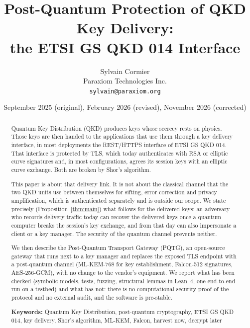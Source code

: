 \documentclass[11pt,letterpaper]{article}
\title{\textbf{Post-Quantum Protection of QKD Key Delivery:\\ the ETSI GS QKD 014 Interface}}
\author{
    Sylvain Cormier \\
    Paraxiom Technologies Inc. \\
    \texttt{sylvain@paraxiom.org}
}
\date{September 2025 (original), February 2026 (revised), November 2026 (corrected)}
\begin{document}
\maketitle

\begin{abstract}
Quantum Key Distribution (QKD) produces keys whose secrecy rests on physics. Those keys are then handed to the applications that use them through a key delivery interface, in most deployments the REST/HTTPS interface of ETSI GS QKD 014. That interface is protected by TLS, which today authenticates with RSA or elliptic curve signatures and, in most configurations, agrees its session keys with an elliptic curve exchange. Both are broken by Shor's algorithm.

This paper is about that delivery link. It is not about the classical channel that the two QKD units use between themselves for sifting, error correction and privacy amplification, which is authenticated separately and is outside our scope. We state precisely (Proposition~\ref{thm:main}) what follows for the delivered keys: an adversary who records delivery traffic today can recover the delivered keys once a quantum computer breaks the session's key exchange, and from that day can also impersonate a client or a key manager. The security of the quantum channel prevents neither.

We then describe the Post-Quantum Transport Gateway (PQTG), an open-source gateway that runs next to a key manager and replaces the exposed TLS endpoint with a post-quantum channel (ML-KEM-768 for key establishment, Falcon-512 signatures, AES-256-GCM), with no change to the vendor's equipment. We report what has been checked (symbolic models, tests, fuzzing, structural lemmas in Lean~4, one end-to-end run on a testbed) and what has not: there is no computational security proof of the protocol and no external audit, and the software is pre-stable.

\medskip
\noindent\textbf{Keywords:} Quantum Key Distribution, post-quantum cryptography, ETSI GS QKD 014, key delivery, Shor's algorithm, ML-KEM, Falcon, harvest now, decrypt later
\end{abstract}
\end{document}
